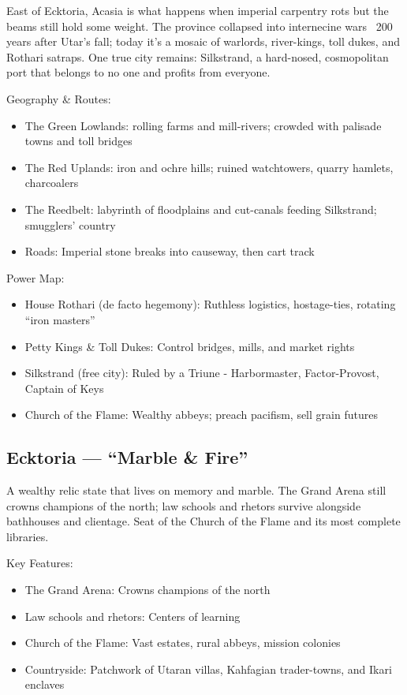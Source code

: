 East of Ecktoria, Acasia is what happens when imperial carpentry rots but the beams still hold some weight. The province collapsed into internecine wars ~200 years after Utar's fall; today it's a mosaic of warlords, river-kings, toll dukes, and Rothari satraps. One true city remains: Silkstrand, a hard-nosed, cosmopolitan port that belongs to no one and profits from everyone.

Geography \& Routes:
\begin{itemize}
    \item The Green Lowlands: rolling farms and mill-rivers; crowded with palisade towns and toll bridges
    \item The Red Uplands: iron and ochre hills; ruined watchtowers, quarry hamlets, charcoalers
    \item The Reedbelt: labyrinth of floodplains and cut-canals feeding Silkstrand; smugglers' country
    \item Roads: Imperial stone breaks into causeway, then cart track
\end{itemize}

Power Map:
\begin{itemize}
    \item House Rothari (de facto hegemony): Ruthless logistics, hostage-ties, rotating ``iron masters''
    \item Petty Kings \& Toll Dukes: Control bridges, mills, and market rights
    \item Silkstrand (free city): Ruled by a Triune - Harbormaster, Factor-Provost, Captain of Keys
    \item Church of the Flame: Wealthy abbeys; preach pacifism, sell grain futures
\end{itemize}

\subsection{Ecktoria --- ``Marble \& Fire''}
\label{sec:ectkoria}

A wealthy relic state that lives on memory and marble. The Grand Arena still crowns champions of the north; law schools and rhetors survive alongside bathhouses and clientage. Seat of the Church of the Flame and its most complete libraries.

Key Features:
\begin{itemize}
    \item The Grand Arena: Crowns champions of the north
    \item Law schools and rhetors: Centers of learning
    \item Church of the Flame: Vast estates, rural abbeys, mission colonies
    \item Countryside: Patchwork of Utaran villas, Kahfagian trader-towns, and Ikari enclaves
\end{itemize}

